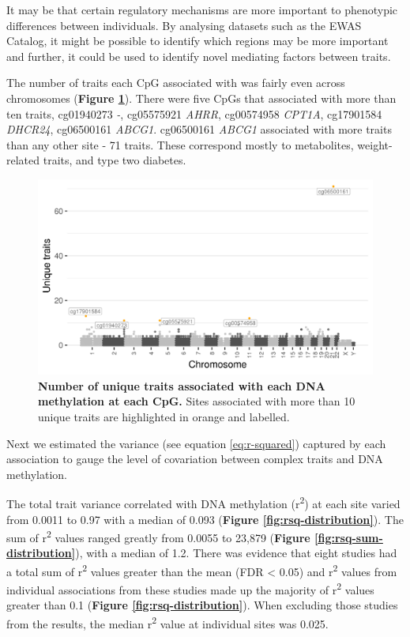 \documentclass[11pt,oneside]{bristolthesis}
\begin{document}
It may be that certain regulatory mechanisms are more important to phenotypic differences between individuals. By analysing datasets such as the EWAS Catalog, it might be possible to identify which regions may be more important and further, it could be used to identify novel mediating factors between traits.

The number of traits each CpG associated with was fairly even across chromosomes (\textbf{Figure \ref{fig:traits-manhattan}}). There were five CpGs that associated with more than ten traits, cg01940273 \emph{-}, cg05575921 \emph{AHRR}, cg00574958 \emph{CPT1A}, cg17901584 \emph{DHCR24}, cg06500161 \emph{ABCG1}. cg06500161 \emph{ABCG1} associated with more traits than any other site - 71 traits. These correspond mostly to metabolites, weight-related traits, and type two diabetes.


\begin{figure}

{\centering \includegraphics[width=1\linewidth]{figure/04-properties_of_ewas/traits_per_dmp_at_1e-07} 

}

\caption{\textbf{Number of unique traits associated with each DNA methylation at each CpG.} Sites associated with more than 10 unique traits are highlighted in orange and labelled.}\label{fig:traits-manhattan}
\end{figure}
Next we estimated the variance (see equation \eqref{eq:r-squared}) captured by each association to gauge the level of covariation between complex traits and DNA methylation.

The total trait variance correlated with DNA methylation (r\textsuperscript{2}) at each site varied from 0.0011 to 0.97 with a median of 0.093 (\textbf{Figure \ref{fig:rsq-distribution}}). The sum of r\textsuperscript{2} values ranged greatly from 0.0055 to 23,879 (\textbf{Figure \ref{fig:rsq-sum-distribution}}), with a median of 1.2. There was evidence that eight studies had a total sum of r\textsuperscript{2} values greater than the mean (FDR \textless{} 0.05) and r\textsuperscript{2} values from individual associations from these studies made up the majority of r\textsuperscript{2} values greater than 0.1 (\textbf{Figure \ref{fig:rsq-distribution}}). When excluding those studies from the results, the median r\textsuperscript{2} value at individual sites was 0.025.
\end{document}

